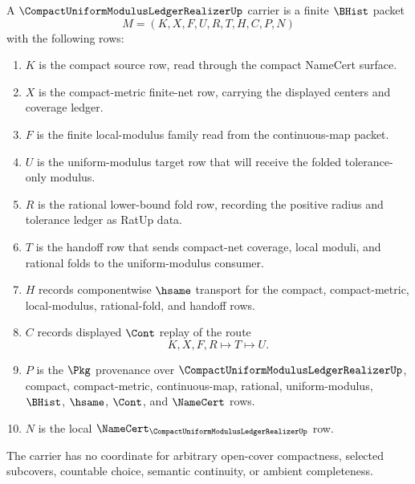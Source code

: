 \begin{definition}
\label{def:compact-uniform-modulus-ledger-realizer-carrier}
A $\CompactUniformModulusLedgerRealizerUp$ carrier is a finite $\BHist$ packet
$$
M=(K,X,F,U,R,T,H,C,P,N)
$$
with the following rows:
\begin{enumerate}
\item $K$ is the compact source row, read through the compact NameCert surface.
\item $X$ is the compact-metric finite-net row, carrying the displayed centers and coverage ledger.
\item $F$ is the finite local-modulus family read from the continuous-map packet.
\item $U$ is the uniform-modulus target row that will receive the folded tolerance-only modulus.
\item $R$ is the rational lower-bound fold row, recording the positive radius and tolerance ledger as RatUp data.
\item $T$ is the handoff row that sends compact-net coverage, local moduli, and rational folds to the uniform-modulus consumer.
\item $H$ records componentwise $\hsame$ transport for the compact, compact-metric, local-modulus, rational-fold, and handoff rows.
\item $C$ records displayed $\Cont$ replay of the route
$$
K,X,F,R \longmapsto T \longmapsto U .
$$
\item $P$ is the $\Pkg$ provenance over $\CompactUniformModulusLedgerRealizerUp$, compact, compact-metric, continuous-map, rational, uniform-modulus, $\BHist$, $\hsame$, $\Cont$, and $\NameCert$ rows.
\item $N$ is the local $\NameCert_{\CompactUniformModulusLedgerRealizerUp}$ row.
\end{enumerate}
The carrier has no coordinate for arbitrary open-cover compactness, selected subcovers, countable choice, semantic continuity, or ambient completeness.
\end{definition}

